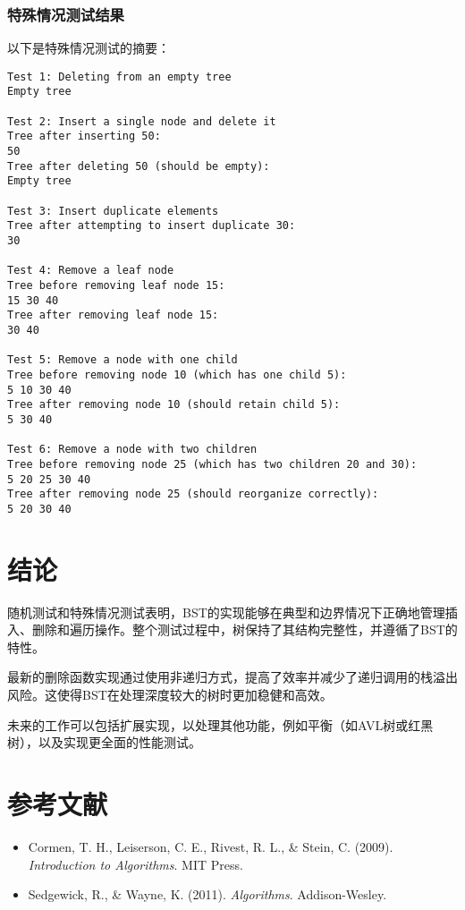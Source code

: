 \documentclass[UTF8]{ctexart}
\begin{document}
\subsubsection{特殊情况测试结果}
以下是特殊情况测试的摘要：

\begin{verbatim}
Test 1: Deleting from an empty tree
Empty tree

Test 2: Insert a single node and delete it
Tree after inserting 50:
50
Tree after deleting 50 (should be empty):
Empty tree

Test 3: Insert duplicate elements
Tree after attempting to insert duplicate 30:
30

Test 4: Remove a leaf node
Tree before removing leaf node 15:
15 30 40
Tree after removing leaf node 15:
30 40

Test 5: Remove a node with one child
Tree before removing node 10 (which has one child 5):
5 10 30 40
Tree after removing node 10 (should retain child 5):
5 30 40

Test 6: Remove a node with two children
Tree before removing node 25 (which has two children 20 and 30):
5 20 25 30 40
Tree after removing node 25 (should reorganize correctly):
5 20 30 40
\end{verbatim}

\section{结论}
随机测试和特殊情况测试表明，BST的实现能够在典型和边界情况下正确地管理插入、删除和遍历操作。整个测试过程中，树保持了其结构完整性，并遵循了BST的特性。

最新的删除函数实现通过使用非递归方式，提高了效率并减少了递归调用的栈溢出风险。这使得BST在处理深度较大的树时更加稳健和高效。

未来的工作可以包括扩展实现，以处理其他功能，例如平衡（如AVL树或红黑树），以及实现更全面的性能测试。

\section{参考文献}
\begin{itemize}
    \item Cormen, T. H., Leiserson, C. E., Rivest, R. L., \& Stein, C. (2009). 	\textit{Introduction to Algorithms}. MIT Press.
    \item Sedgewick, R., \& Wayne, K. (2011). 	\textit{Algorithms}. Addison-Wesley.
\end{itemize}
\end{document}
